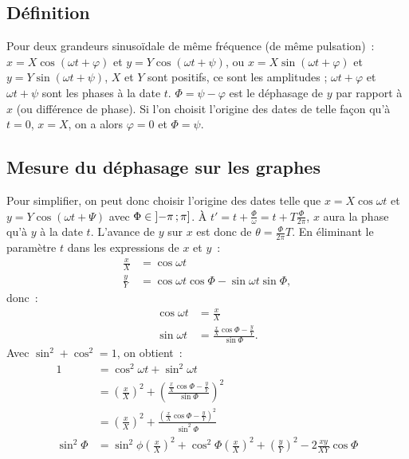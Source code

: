     \subsection{Définition}
            Pour deux grandeurs sinusoïdale de même fréquence (de même pulsation)~: \(x = X\cos(\omega t + \varphi)\) et \(y = Y\cos(\omega t + \psi)\), ou \(x = X\sin(\omega t + \varphi)\) et \(y = Y\sin(\omega t + \psi)\), \(X\) et \(Y\) sont positifs, ce sont les amplitudes ; \(\omega t + \varphi\) et \(\omega t + \psi\) sont les phases à la date \(t\). \(\Phi = \psi -\varphi\) est le déphasage de \(y\) par rapport à \(x\) (ou différence de phase).
            Si l'on choisit l'origine des dates de telle façon qu'à \(t=0\), \(x=X\), on a alors \(\varphi=0\) et \(\Phi = \psi\).
    \subsection{Mesure du déphasage sur les graphes}
            Pour simplifier, on peut donc choisir l'origine des dates telle que \(x = X\cos \omega t\) et \(y=Y\cos(\omega t + \Psi)\) avec \(\Phi \in \left] -\pi \, ;  \pi \right]\). À \(t' = t + \frac{\Phi}{\omega} = t + T\frac{\Phi}{2\pi}\), \(x\) aura la phase qu'à \(y\) à la date \(t\). L'avance de \(y\) sur \(x\) est donc de \(\theta = \frac{\Phi}{2\pi} T\).
            En éliminant le paramètre \(t\) dans les expressions de \(x\) et \(y\)~:
            \begin{align}
                \frac{x}{X} &= \cos\omega t \\
                \frac{y}{Y} &= \cos\omega t \cos\Phi -\sin\omega t \sin\Phi,
            \end{align}
            donc~:
            \begin{align}
                \cos\omega t &= \frac{x}{X} \\
                \sin\omega t &= \frac{\frac{x}{X}\cos\Phi - \frac{y}{Y}}{\sin\Phi}.
            \end{align}
            Avec \(\sin^2+\cos^2=1\), on obtient~:
            \begin{align}
                1 &= \cos^2\omega t + \sin^2\omega t \\
                  &= \left(\frac{x}{X}\right)^2 + \left( \frac{\frac{x}{X}\cos\Phi - \frac{y}{Y}}{\sin\Phi} \right)^2 \\
                  &= \left(\frac{x}{X}\right)^2 + \frac{(\frac{x}{X}\cos\Phi - \frac{y}{Y})^2}{\sin^2\Phi} \\
       \sin^2\Phi &= \sin^2\phi \left(\frac{x}{X}\right)^2 + \cos^2\Phi \left(\frac{x}{X}\right)^2 + \left(\frac{y}{Y}\right)^2 - 2 \frac{xy}{XY} \cos\Phi
            \end{align}
